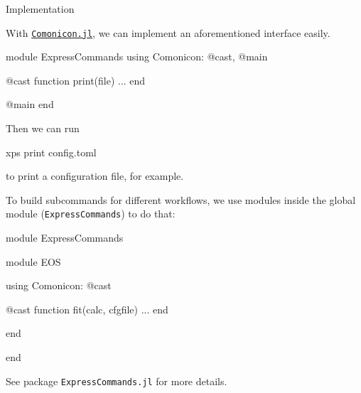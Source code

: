 \begin{frame}{Implementation}

    With \href{https://github.com/comonicon/Comonicon.jl}{\texttt{Comonicon.jl}}, we can implement
    an aforementioned interface easily.

        {\scriptsize
            \begin{algorithmblock}
                \begin{juliaverbatim}
module ExpressCommands
using Comonicon: @cast, @main

@cast function print(file)
    ...
end

@main
end
                \end{juliaverbatim}
            \end{algorithmblock}
        }

    Then we can run

        {\scriptsize
            \begin{algorithmblock}
                xps print config.toml
            \end{algorithmblock}
        }

    to print a configuration file, for example.

    \framebreak

    To build subcommands for different workflows, we use modules inside the global module
    (\texttt{ExpressCommands}) to do that:

    {\scriptsize
    \begin{algorithmblock}
        \begin{juliaverbatim}
module ExpressCommands

module EOS

using Comonicon: @cast

@cast function fit(calc, cfgfile)
    ...
end

end

end
        \end{juliaverbatim}
    \end{algorithmblock}
    }

    See package \texttt{ExpressCommands.jl} for more details.
\end{frame}
